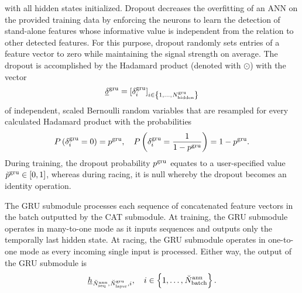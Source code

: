 with all hidden states initialized.
Dropout \cite{Hinton2012} decreases the overfitting of an ANN 
on the provided training data
by enforcing the neurons to learn the detection of stand-alone features
whose informative value is independent from
the relation to other detected features.
For this purpose, dropout randomly sets entries of
a feature vector to zero while maintaining the signal strength on average.
The dropout is accomplished
by the Hadamard product (denoted with $\odot$)
with the vector
\begin{equation}
    \underline{\delta}^\gru
    =
    \left[
        \delta^\gru_i
    \right]_{
        i \in \left\{
            1, \dots, \num[]{\gru}{\text{hidden}}{}{}
        \right\}
    }
\end{equation}
of independent, scaled Bernoulli random variables
that are resampled for every calculated Hadamard product
with the probabilities
\begin{equation}
    P \left(
        \delta^\gru_i = 0
    \right)
    = p^\gru
    ,\quad
    P \left(
        \delta^\gru_i = \frac{1}{1-p^\gru}
    \right)
    = 1 - p^\gru
    .
\end{equation}
During training,
the dropout probability $p^\gru$ equates to 
a user-specified value $\anything[\user]{\gru}{}{}{}{p} \in [0,1]$,
whereas during racing,
it is null
whereby the dropout becomes an identity operation.

The GRU submodule 
processes each sequence of concatenated feature vectors
in the batch outputted by the CAT submodule.
At training, the GRU submodule operates in many-to-one mode
as it inputs sequences and outputs only the temporally last hidden state. 
At racing, the GRU submodule operates in one-to-one mode
as every incoming single input is processed.
Either way, the output of the GRU submodule is
\begin{equation}
    \underline h_{
        \num[\user]{\ann}{\seq}{}{}, 
        \num[\user]{\gru}{\text{layer}}{}{},
        i
    } 
    , \quad 
    i \in \left\{1, \dots, \num[\user]{\ann}{\batch}{}{}\right\}
    .
\end{equation}




